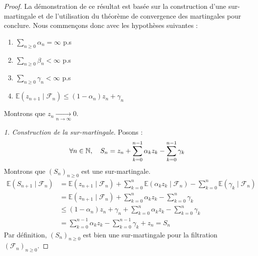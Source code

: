 \begin{proof}
    La démonstration de ce résultat est basée sur la construction d'une sur-martingale et de l'utilisation 
    du théorème de convergence des martingales pour conclure. Nous commençons donc avec les hypothèses suivantes : 
    \begin{enumerate}[label=\roman*)]
        \item $ \sum_{n \geqslant 0} \alpha_n = \infty $ p.s
        \item $ \sum_{n \geqslant 0} \beta_n < \infty $ p.s 
        \item $ \sum_{n \geqslant 0} \gamma_n < \infty $ p.s
        \item $ \mathbb{E}(z_{n+1} \mid \mathcal{F}_n) \leqslant (1 - \alpha_n) z_n + \gamma_n$
    \end{enumerate}
    Montrons que $ z_n \underset{n \to \infty}{\longrightarrow} 0$.
    
    \medskip

    \emph{1. Construction de la sur-martingale}. 
    Posons : 
        $$ \forall n \in \mathbb{N}, \quad S_n = z_n + \sum_{k=0}^{n-1} \alpha_k z_k - \sum_{k=0}^{n-1} \gamma_k $$ 
    Montrons que $(S_n)_{n \geqslant 0}$ est une sur-martingale. 
    \begin{align*}
        \mathbb{E}(S_{n+1} \mid \mathcal{F}_n) &= \mathbb{E}(z_{n+1} \mid \mathcal{F}_n) + \sum_{k=0}^{n} \mathbb{E}(\alpha_k z_k \mid \mathcal{F}_n)
            - \sum_{k=0}^{n} \mathbb{E}( \gamma_k \mid \mathcal{F}_n) \\ 
        &= \mathbb{E}(z_{n+1} \mid \mathcal{F}_n) + \sum_{k=0}^{n} \alpha_k z_k - \sum_{k=0}^{n} \gamma_k \\ 
        &\leqslant (1 - \alpha_n) z_n + \gamma_n + \sum_{k=0}^{n} \alpha_k z_k - \sum_{k=0}^{n} \gamma_k \\
        &= \sum_{k=0}^{n-1} \alpha_k z_k - \sum_{k=0}^{n-1} \gamma_k + z_n = S_n 
    \end{align*}
    Par définition, $(S_n)_{n \geqslant 0}$ est bien une sur-martingale pour la filtration $ (\mathcal{F}_n)_{n \geqslant 0}$.

    \medskip


\end{proof}

